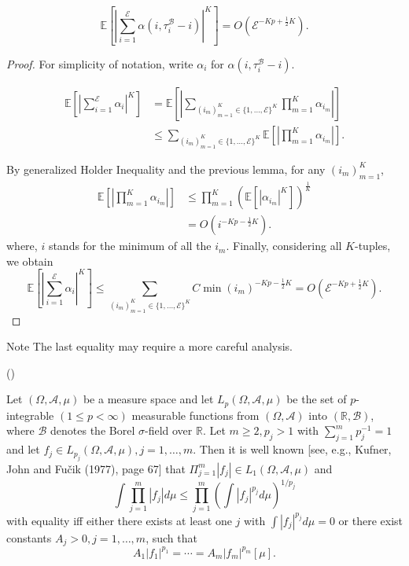 \begin{lemma}
	\[
		\mathbb{E}\left[ \left| \sum_{i = 1}^{\mathcal{E}}\alpha(i, \tau_i^{\mathcal{B}} - i) \right| ^K \right] 
		= O\left(\mathcal{E}^{-Kp + \frac{1}{2}K}\right)
	.\]
	\label{lem:local-drift-moment}
\end{lemma}
\begin{proof}
	For simplicity of notation, write $\alpha_i$ for $\alpha(i, \tau_i^{\mathcal{B}} - i)$.

	\begin{align*}
		\mathbb{E}\left[ \left| \sum_{i = 1}^{\mathcal{E}} \alpha_i \right| ^K \right] 
		&= \mathbb{E}\left[ 
			\left|
			\sum_{\left( i_m \right)_{m = 1}^K \in \{1, \ldots, \mathcal{E}\}^K} 
			\prod_{m = 1}^{K} \alpha_{i_m} 
		\right|
		\right] \\
		&\le  
		\sum_{\left( i_m \right)_{m = 1}^K \in \{1, \ldots, \mathcal{E}\}^K} 
		\mathbb{E}\left[ \left| \prod_{m = 1}^{K} \alpha_{i_m} \right| \right]
	.\end{align*}

	By generalized Holder Inequality and the previous lemma, for any $\left( i_m \right) _{m = 1}^K$,
	\begin{align*}
		\mathbb{E}\left[ \left| \prod_{m = 1}^{K} \alpha_{i_m} \right| \right]
		&\le \prod_{m = 1}^{K} \left(
			\mathbb{E}\left[
			|\alpha_{i_m}|^K
		\right] \right)^{\frac{1}{K}}  \\
		&= O(i^{-Kp - \frac{1}{2}K}) 
	.\end{align*}
	where, $i$ stands for the minimum of all the $i_m$.
	Finally, considering all $K$-tuples, we obtain
\[
		\mathbb{E}\left[ \left| \sum_{i = 1}^{\mathcal{E}} \alpha_i \right| ^K \right] 
		\le 
		\sum_{\left( i_m \right)_{m = 1}^K \in \{1, \ldots, \mathcal{E}\}^K}  
		C \min(i_m)^{- K p - \frac{1}{2} K}
		= O\left(\mathcal{E}^{-Kp + \frac{1}{2}K}\right)
.\] 
\end{proof}
\begin{note}{Note}
	The last equality may require a more careful analysis.
\end{note}


\begin{theorem}
	(\cite{finnerHolderInequality1992})

	Let $(\Omega, \mathscr{A}, \mu)$ be a measure space and let $L_p(\Omega, \mathscr{A}, \mu)$ be the set of $p$-integrable $(1 \leq p<\infty)$ measurable functions from $(\Omega, \mathscr{A})$ into $(\mathbb{R}, \mathscr{B})$, where $\mathscr{B}$ denotes the Borel $\sigma$-field over $\mathbb{R}$. Let $m \geq 2, p_j>1$ with $\sum_{j=1}^m p_j^{-1}=1$ and let $f_j \in L_{p_j}(\Omega, \mathscr{A}, \mu), j=1, \ldots, m$. Then it is well known [see, e.g., Kufner, John and Fučik (1977), page 67] that $\Pi_{j=1}^m\left|f_j\right| \in L_1(\Omega, \mathscr{A}, \mu)$ and
\[
\int \prod_{j=1}^m\left|f_j\right| d \mu \leq \prod_{j=1}^m\left(\int\left|f_j\right|^{p_j} d \mu\right)^{1 / p_j}
\]
with equality iff either there exists at least one $j$ with $\int\left|f_j\right|^{p_j} d \mu=0$ or there exist constants $A_j>0, j=1, \ldots, m$, such that
\[
A_1\left|f_1\right|^{p_1}=\cdots=A_m\left|f_m\right|^{p_m}[\mu] .
\]
\end{theorem}



